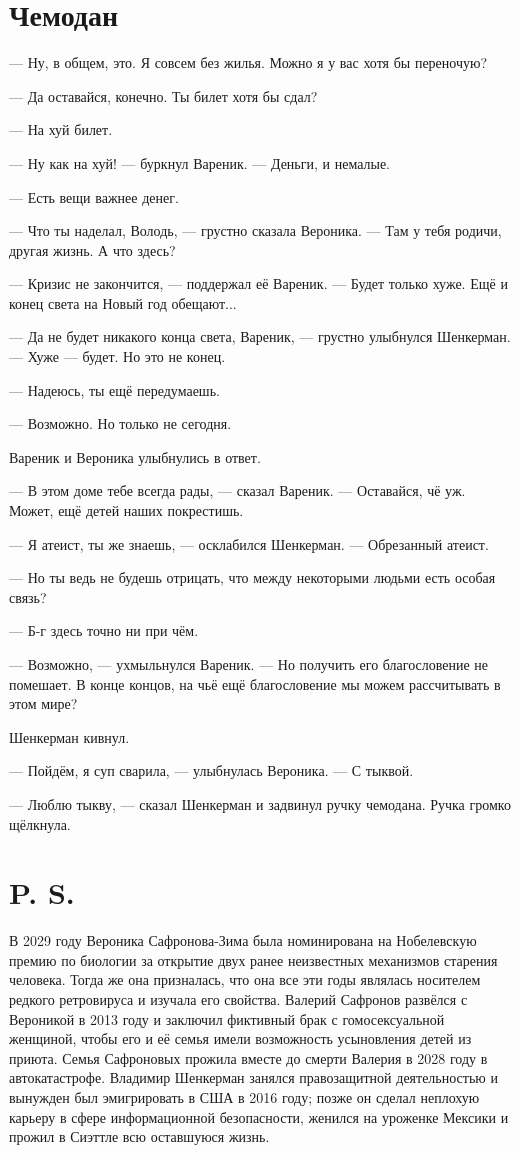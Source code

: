 \documentclass[a4paper,10pt,fleqn]{book}\usepackage{polyglossia}\setdefaultlanguage{english}\setotherlanguage{russian}\defaultfontfeatures{Ligatures=TeX,Mapping=tex-text} \usepackage{xcolor}\definecolor{lightgray}{HTML}{bbbbbb}\color{lightgray}\newcommand{\ml}[3]{\textcolor{black}{#3}}
\begin{document}
\section{Чемодан}

--- Ну, в общем, это.
Я совсем без жилья.
Можно я у вас хотя бы переночую?

--- Да оставайся, конечно.
Ты билет хотя бы сдал?

--- На хуй билет.

--- Ну как на хуй! --- буркнул Вареник.
--- Деньги, и немалые.

--- Есть вещи важнее денег.

--- Что ты наделал, Володь, --- грустно сказала Вероника.
--- Там у тебя родичи, другая жизнь.
А что здесь?

--- Кризис не закончится, --- поддержал её Вареник.
--- Будет только хуже.
Ещё и конец света на Новый год обещают...

--- Да не будет никакого конца света, Вареник, --- грустно улыбнулся Шенкерман.
--- Хуже --- будет.
Но это не конец.

--- Надеюсь, ты ещё передумаешь.

--- Возможно.
Но только не сегодня.

Вареник и Вероника улыбнулись в ответ.

--- В этом доме тебе всегда рады, --- сказал Вареник.
--- Оставайся, чё уж.
Может, ещё детей наших покрестишь.

--- Я атеист, ты же знаешь, --- осклабился Шенкерман.
--- Обрезанный атеист.

--- Но ты ведь не будешь отрицать, что между некоторыми людьми есть особая связь?

--- Б-г здесь точно ни при чём.

--- Возможно, --- ухмыльнулся Вареник.
--- Но получить его благословение не помешает.
В конце концов, на чьё ещё благословение мы можем рассчитывать в этом мире?

Шенкерман кивнул.

--- Пойдём, я суп сварила, --- улыбнулась Вероника.
--- С тыквой.

--- Люблю тыкву, --- сказал Шенкерман и задвинул ручку чемодана.
Ручка громко щёлкнула.

\section{P. S.}

В 2029 году Вероника Сафронова-Зима была номинирована на Нобелевскую премию по биологии за открытие двух ранее неизвестных механизмов старения человека.
Тогда же она призналась, что она все эти годы являлась носителем редкого ретровируса и изучала его свойства.
Валерий Сафронов развёлся с Вероникой в 2013 году и заключил фиктивный брак с гомосексуальной женщиной, чтобы его и её семья имели возможность усыновления детей из приюта.
Семья Сафроновых прожила вместе до смерти Валерия в 2028 году в автокатастрофе.
Владимир Шенкерман занялся правозащитной деятельностью и вынужден был эмигрировать в США в 2016 году;
позже он сделал неплохую карьеру в сфере информационной безопасности, женился на уроженке Мексики и прожил в Сиэттле всю оставшуюся жизнь.
\end{document}
